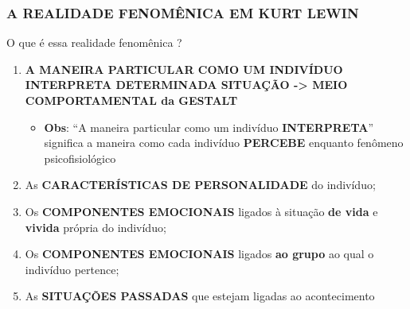 \documentclass[
]{book}
\providecommand{\tightlist}{%
  \setlength{\itemsep}{0pt}\setlength{\parskip}{0pt}}
\begin{document}
\hypertarget{a-realidade-fenomuxeanica-em-kurt-lewin}{%
\subsubsection{A REALIDADE FENOMÊNICA EM KURT LEWIN}\label{a-realidade-fenomuxeanica-em-kurt-lewin}}

O que é essa realidade fenomênica ?

\begin{enumerate}
\def\labelenumi{\arabic{enumi}.}
\tightlist
\item
  \textbf{A MANEIRA PARTICULAR COMO UM INDIVÍDUO INTERPRETA DETERMINADA SITUAÇÃO -\textgreater{} MEIO COMPORTAMENTAL da GESTALT}

  \begin{itemize}
  \tightlist
  \item
    \textbf{Obs}: ``A maneira particular como um indivíduo \textbf{INTERPRETA}'' significa a maneira como cada indivíduo \textbf{PERCEBE} enquanto fenômeno psicofisiológico
  \end{itemize}
\item
  As \textbf{CARACTERÍSTICAS DE PERSONALIDADE} do indivíduo;
\item
  Os \textbf{COMPONENTES EMOCIONAIS} ligados à situação \textbf{de vida} e \textbf{vivida} própria do indivíduo;
\item
  Os \textbf{COMPONENTES EMOCIONAIS} ligados \textbf{ao grupo} ao qual o indivíduo pertence;
\item
  As \textbf{SITUAÇÕES PASSADAS} que estejam ligadas ao acontecimento
\end{enumerate}
\end{document}
